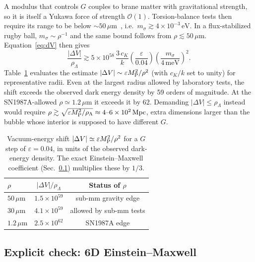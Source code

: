\documentclass[aps,prd,reprint,superscriptaddress,nofootinbib,floatfix]{revtex4-2}
\theoremstyle{definition}
\newcommand{\MP}{M_{\rm P}}
\newcommand{\Mpc}{\,\mathrm{Mpc}}
\newcommand{\eV}{\,\mathrm{eV}}
\newcommand{\um}{\,\mu\mathrm{m}}
\begin{document}
A modulus that controls $G$ couples to brane matter with gravitational strength, so it is itself a Yukawa force of strength $\mathcal{O}(1)$. Torsion-balance tests then require its range to be below $\sim\!50\um$~\cite{Kapner2007,Lee2020}, i.e.\ $m_\sigma \gtrsim 4\times10^{-3}\eV$. In a flux-stabilized rugby ball, $m_\sigma\sim\rho^{-1}$ and the same bound follows from $\rho\lesssim50\um$. Equation~\eqref{eq:dV} then gives
\begin{equation}
\frac{|\Delta V|}{\rho_\Lambda} \gtrsim 5\times10^{58}\,\frac{3\,c_K}{k}\left(\frac{\varepsilon}{0.04}\right)\left(\frac{m_\sigma}{4\,\mathrm{meV}}\right)^{2}. \label{eq:bound}
\end{equation}
Table~\ref{tab:dV} evaluates the estimate $|\Delta V|\sim\varepsilon\MP^2/\rho^2$ (with $c_K/k$ set to unity) for representative radii. Even at the largest radius allowed by laboratory tests, the shift exceeds the observed dark energy density by 59 orders of magnitude. At the SN1987A-allowed $\rho\simeq1.2\um$ it exceeds it by 62. Demanding $|\Delta V|\le\rho_\Lambda$ instead would require $\rho\gtrsim\sqrt{\varepsilon\MP^2/\rho_\Lambda}\approx 4\text{--}6\times10^2\Mpc$, extra dimensions larger than the bubble whose interior is supposed to have different $G$.

\begin{table}[t]
\caption{Vacuum-energy shift $|\Delta V|\simeq\varepsilon\MP^2/\rho^2$ for a $G$ step of $\varepsilon=0.04$, in units of the observed dark-energy density. The exact Einstein--Maxwell coefficient (Sec.~\ref{sec:EM}) multiplies these by $1/3$.}
\label{tab:dV}
\begin{ruledtabular}
\begin{tabular}{lcc}
$\rho$ & $|\Delta V|/\rho_\Lambda$ & Status of $\rho$ \\
\hline
$50\um$ & $1.5\times10^{59}$ & sub-mm gravity edge \\
$30\um$ & $4.1\times10^{59}$ & allowed by sub-mm tests \\
$1.2\um$ & $2.5\times10^{62}$ & SN1987A edge \\
\end{tabular}
\end{ruledtabular}
\end{table}

\subsection{Explicit check: 6D Einstein--Maxwell}\label{sec:EM}
\end{document}
